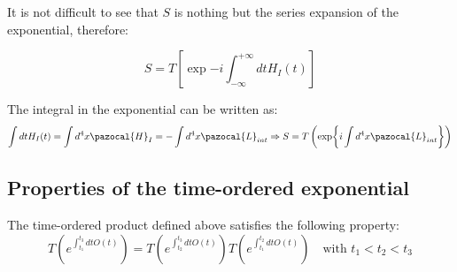 \documentclass[../main.tex]{subfiles}
\begin{document}
It is not difficult to see that $S$ is nothing but the series expansion of the exponential, therefore:
\begin{kaobox}[frametitle=Dyson formula]
\[
S=T\left[\exp{-i\int_{-\infty}^{+\infty} dtH_I(t)}\right]
\]
\end{kaobox}
The integral in the exponential can be written as:
\[
\int dtH_I(t)=\int d^4x\pazocal{H}_I=-\int d^4x\pazocal{L}_{int}\Rightarrow S=T\left(\exp{i\int d^4x\pazocal{L}_{int}}\right)
\]
\subsection{Properties of the time-ordered exponential}
\begin{proposition}
The time-ordered product defined above satisfies the following property:
\[
T\left(e^{\int_{t_1}^{t_3}dtO(t)}\right)=T\left(e^{\int_{t_2}^{t_3}dtO(t)}\right)T\left(e^{\int_{t_1}^{t_2}dtO(t)}\right) \quad \text{with } t_1<t_2<t_3
\]
\end{proposition}
\end{document}
